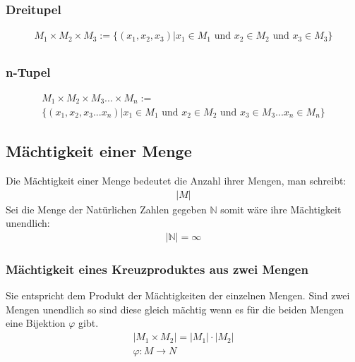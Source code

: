 \documentclass[a4paper]{scrartcl}
\begin{document}
\subsubsection{Dreitupel}
\begin{align}
M_1 \times M_2 \times M_3:= \{( x_1, x_2, x_3 ) | x_1 \in M_1 \text{ und } x_2 \in M_2 \text{ und } x_3 \in M_3 \} \\
\end{align}

\subsubsection{n-Tupel}
\begin{align}
M_1 \times  M_2 \times M_3 ... \times M_n:= \\
\{( x_1, x_2, x_3 ... x_n ) | x_1 \in M_1 \text{ und } x_2 \in M_2 \text{ und } x_3 \in M_3 ...  x_n \in M_n \}
\end{align}

\subsection{Mächtigkeit einer Menge}
Die Mächtigkeit einer Menge bedeutet die Anzahl ihrer Mengen, man schreibt:
\begin{align}
|M|
\end{align}
Sei die Menge der Natürlichen Zahlen gegeben $\mathbb{N}$ somit wäre ihre Mächtigkeit unendlich: 
\begin{align}
|\mathbb{N}|=\infty
\end{align}

\subsubsection{Mächtigkeit eines Kreuzproduktes aus zwei Mengen}
Sie entspricht dem Produkt der Mächtigkeiten der einzelnen Mengen. Sind zwei Mengen unendlich so sind diese gleich mächtig wenn es für die beiden Mengen eine Bijektion $\varphi$ gibt.
\begin{align}
|M_1 \times M_2|= |M_1| \cdot |M_2| \\
\varphi : M \rightarrow N 
\end{align}
\end{document}
